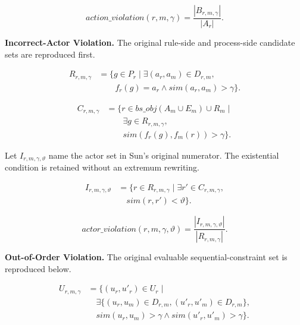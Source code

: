 \documentclass[conference]{IEEEtran}
\begin{document}
\begin{equation}
\mathit{action\_violation}(r,m,\gamma)
=\frac{|B_{r,m,\gamma}|}{|A_r|}.
\label{eq:missing}
\end{equation}

\textbf{Incorrect-Actor Violation.} The original rule-side and process-side candidate sets are reproduced first.

\begin{equation}
\begin{aligned}
R_{r,m,\gamma}
&=\bigl\{g\in P_r
  \mid\exists(a_r,a_m)\in D_{r,m},\\
&\qquad f_r(g)=a_r\land
  sim(a_r,a_m)>\gamma\bigr\}.
\end{aligned}
\label{eq:actor_rule_candidates}
\end{equation}

\begin{equation}
\begin{aligned}
C_{r,m,\gamma}
&=\bigl\{r\in\mathit{bs\_obj}(A_m\cup E_m)
  \cup R_m\mid\\
&\qquad\exists g\in R_{r,m,\gamma},\\
&\qquad sim(f_r(g),f_m(r))>\gamma\bigr\}.
\end{aligned}
\label{eq:actor_process_candidates}
\end{equation}

Let \(I_{r,m,\gamma,\vartheta}\) name the actor set in Sun's original numerator. The existential condition is retained without an extremum rewriting.

\begin{equation}
\begin{aligned}
I_{r,m,\gamma,\vartheta}
&=\bigl\{r\in R_{r,m,\gamma}
  \mid\exists r'\in C_{r,m,\gamma},\\
&\quad sim(r,r')<\vartheta\bigr\}.
\end{aligned}
\label{eq:actor_mismatch_set}
\end{equation}

\begin{equation}
\mathit{actor\_violation}(r,m,\gamma,\vartheta)
=\frac{|I_{r,m,\gamma,\vartheta}|}{|R_{r,m,\gamma}|}.
\label{eq:actor}
\end{equation}

\textbf{Out-of-Order Violation.} The original evaluable sequential-constraint set is reproduced below.

\begin{equation}
\begin{aligned}
U_{r,m,\gamma}
&=\bigl\{(u_r,u'_r)\in U_r\mid\\
&\quad\exists\bigl\{(u_r,u_m)\in D_{r,m},
  (u'_r,u'_m)\in D_{r,m}\bigr\},\\
&\quad sim(u_r,u_m)>\gamma
  \land sim(u'_r,u'_m)>\gamma\bigr\}.
\end{aligned}
\label{eq:order_evaluable}
\end{equation}
\end{document}

